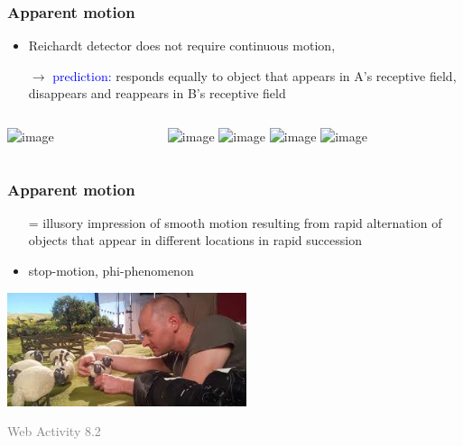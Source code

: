 \documentclass[]{beamer}
\begin{document}
\begin{frame}
 \frametitle{Apparent motion}
 \begin{overlayarea}{110mm}{80mm}
\begin{itemize}
   \item Reichardt detector does not require continuous motion,
   \item[$\rightarrow$]\textcolor{blue}{prediction:} responds equally to object that appears in A's receptive field, disappears and reappears in B's receptive field
\end{itemize}

\begin{columns}[T]
 \begin{column}{40mm}
\includegraphics<1->[width=30mm]{figs/l7/reichardt_detector_single.png}
 \end{column}

 \begin{column}{40mm}
\begin{center}
\includegraphics<2>[width=40mm]{figs/l7/daumenkino_daffy_1.png} 
\includegraphics<3>[width=40mm]{figs/l7/daumenkino_daffy_2.png} 
\includegraphics<4>[width=40mm]{figs/l7/daumenkino_daffy_3.png} 
\includegraphics<5>[width=40mm]{figs/l7/daumenkino_daffy_4.png} 
\end{center}
\end{column}
\end{columns}
\end{overlayarea}
\end{frame}


\begin{frame}
\frametitle{Apparent motion}
 \begin{overlayarea}{110mm}{80mm}
 \begin{itemize}
 \item[=] illusory impression of smooth motion resulting from rapid alternation of objects that appear in different locations in rapid succession
 \item stop-motion, phi-phenomenon
\end{itemize}
\begin{center}
\includegraphics[width=70mm]{figs/l7/filming_shaun2.jpg} 
\end{center}

 {\vspace{3mm}\textcolor{gray}{Web Activity 8.2}}
\end{overlayarea}
\end{frame}
\end{document}
